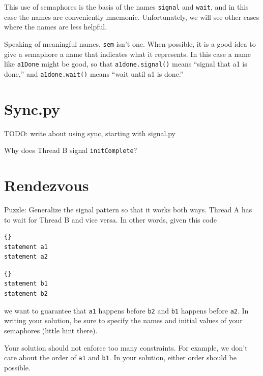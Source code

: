 \documentclass{book}
\begin{document}
This use of semaphores is the basis of the names {\tt signal}
and {\tt wait}, and in this case the names are conveniently
mnemonic.  Unfortunately, we will see other cases where the
names are less helpful.

Speaking of meaningful names, {\tt sem} isn't one.  When
possible, it is a good idea to give a semaphore a name
that indicates what it represents.  In this case a name like
    {\tt a1Done} might be good, so that {\tt a1done.signal()} means
``signal that a1 is done,'' and {\tt a1done.wait()} means
``wait until a1 is done.''


\section{Sync.py}
\label{sync.py}

TODO: write about using sync, starting with signal.py

Why does Thread B signal {\tt initComplete}?



\section{Rendezvous}
\label{rendezvous}

Puzzle: Generalize the signal pattern so that it works both
ways.  Thread A has to wait for Thread B and vice versa.  In other
words, given this code

\begin{minipage}[t]{0.35\textwidth}
    \begin{lstlisting}[title={Thread A}]{}
statement a1
statement a2
\end{lstlisting}
\end{minipage}
\hfill
\begin{minipage}[t]{0.35\textwidth}
    \begin{lstlisting}[title={Thread B}]{}
statement b1
statement b2
\end{lstlisting}
\end{minipage}

we want to guarantee that {\tt a1} happens before {\tt b2} and
    {\tt b1} happens before {\tt a2}.  In writing your solution, be sure
to specify the names and initial values of your semaphores
(little hint there).

Your solution should not enforce too many constraints.  For example,
we don't care about the order of {\tt a1} and {\tt b1}.  In your
solution, either order should be possible.
\end{document}

